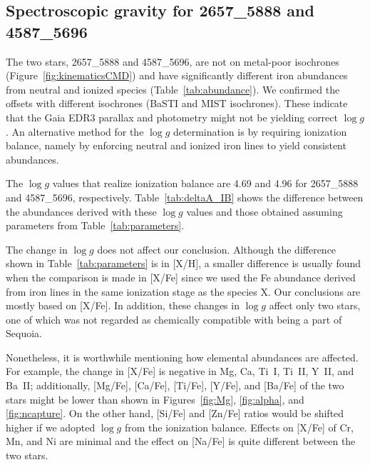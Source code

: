 \documentclass{aa}
\begin{document}
\begin{appendix}
\section{Spectroscopic gravity for 2657\_5888 and 4587\_5696 \label{sec:appendixC}}


The two stars, 2657\_5888 and 4587\_5696, are not on metal-poor isochrones (Figure~\ref{fig:kinematicsCMD}) and have significantly different iron abundances from neutral and ionized species (Table~\ref{tab:abundance}).
We confirmed the offsets with different isochrones (BaSTI and MIST isochrones). 
These indicate that the Gaia EDR3 parallax and photometry might not be yielding correct $\log g$. 
An alternative method for the $\log g$ determination is by requiring ionization balance, namely by enforcing neutral and ionized iron lines to yield consistent abundances.



The $\log g$ values that realize ionization balance are 4.69 and 4.96 for 2657\_5888 and 4587\_5696, respectively. 
Table~\ref{tab:deltaA_IB} shows the difference between the abundances derived with these $\log g$ values and those obtained assuming parameters from Table~\ref{tab:parameters}.



The change in $\log g$ does not affect our conclusion.
Although the difference shown in Table~\ref{tab:parameters} is in [{X}/{H}], a smaller difference is usually found when the comparison is made in [{X}/{Fe}] since we used the Fe abundance derived from iron lines in the same ionization stage as the species X.
Our conclusions are mostly based on [{X}/{Fe}].
In addition, these changes in $\log g$ affect only two stars, one of which was not regarded as chemically compatible with being a part of Sequoia.



Nonetheless, it is worthwhile mentioning how elemental abundances are affected.
For example, the change in [{X}/{Fe}] is negative in Mg, Ca, Ti~I, Ti~II, Y~II, and Ba~II; additionally, [{Mg}/{Fe}], [{Ca}/{Fe}], [{Ti}/{Fe}], [{Y}/{Fe}], and [{Ba}/{Fe}] of the two stars might be lower than shown in Figures~\ref{fig:Mg}, \ref{fig:alpha}, and \ref{fig:ncapture}.
On the other hand, [{Si}/{Fe}] and [{Zn}/{Fe}] ratios would be shifted higher if we adopted $\log g$ from the ionization balance. 
Effects on [{X}/{Fe}] of Cr, Mn, and Ni are minimal and the effect on [{Na}/{Fe}] is quite different between the two stars.



\end{appendix}
\end{document}
